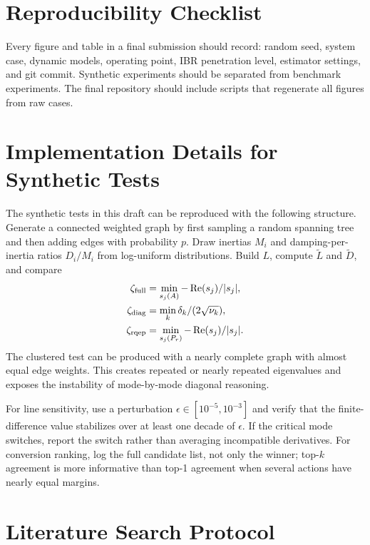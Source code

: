 \documentclass[journal]{IEEEtran}
\newcommand{\Lt}{\widetilde L}
\newcommand{\Dt}{\widetilde D}
\newcommand{\Real}{\operatorname{Re}}
\begin{document}
\section{Reproducibility Checklist}

Every figure and table in a final submission should record: random seed, system case, dynamic models, operating point, IBR penetration level, estimator settings, and git commit. Synthetic experiments should be separated from benchmark experiments. The final repository should include scripts that regenerate all figures from raw cases.

\section{Implementation Details for Synthetic Tests}

The synthetic tests in this draft can be reproduced with the following structure. Generate a connected weighted graph by first sampling a random spanning tree and then adding edges with probability $p$. Draw inertias $M_i$ and damping-per-inertia ratios $D_i/M_i$ from log-uniform distributions. Build $L$, compute $\Lt$ and $\Dt$, and compare
\begin{align}
\zeta_{\rm full} &= \min_{s_j(A)}-\Real(s_j)/|s_j|,\\
\zeta_{\rm diag} &= \min_k \delta_k/(2\sqrt{\nu_k}),\\
\zeta_{\rm rqep} &= \min_{s_j(P_r)}-\Real(s_j)/|s_j|.
\end{align}
The clustered test can be produced with a nearly complete graph with almost equal edge weights. This creates repeated or nearly repeated eigenvalues and exposes the instability of mode-by-mode diagonal reasoning.

For line sensitivity, use a perturbation $\epsilon\in[10^{-5},10^{-3}]$ and verify that the finite-difference value stabilizes over at least one decade of $\epsilon$. If the critical mode switches, report the switch rather than averaging incompatible derivatives. For conversion ranking, log the full candidate list, not only the winner; top-$k$ agreement is more informative than top-1 agreement when several actions have nearly equal margins.

\section{Literature Search Protocol}
\end{document}
